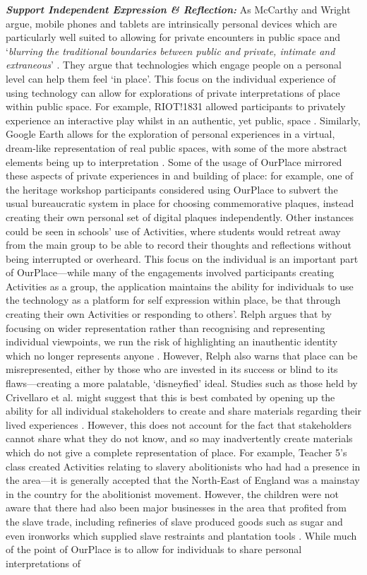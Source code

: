 \textbf{\textit{Support Independent Expression \& Reflection:}} As McCarthy and Wright argue, mobile phones and tablets are intrinsically personal devices which are particularly well suited to allowing for private encounters in public space and `\textit{blurring the traditional boundaries between public and private, intimate and extraneous}' \citep{McCarthy2005}. They argue that technologies which engage people on a personal level can help them feel `in place'. This focus on the individual experience of using technology can allow for explorations of private interpretations of place within public space. For example, RIOT!1831 allowed participants to privately experience an interactive play whilst in an authentic, yet public, space \citep{Blythe2006}. Similarly, Google Earth allows for the exploration of personal experiences in a virtual, dream-like representation of real public spaces, with some of the more abstract elements being up to interpretation \citep{Gerstmann2016}. Some of the usage of OurPlace mirrored these aspects of private experiences in and building of place: for example, one of the heritage workshop participants considered using OurPlace to subvert the usual bureaucratic system in place for choosing commemorative plaques, instead creating their own personal set of digital plaques independently. Other instances could be seen in schools' use of Activities, where students would retreat away from the main group to be able to record their thoughts and reflections without being interrupted or overheard. This focus on the individual is an important part of OurPlace---while many of the engagements involved participants creating Activities as a group, the application maintains the ability for individuals to use the technology as a platform for self expression within place, be that through creating their own Activities or responding to others'. Relph argues that by focusing on wider representation rather than recognising and representing individual viewpoints, we run the risk of highlighting an inauthentic identity which no longer represents anyone \citep{Relph1976}. However, Relph also warns that place can be misrepresented, either by those who are invested in its success or blind to its flaws---creating a more palatable, `disneyfied' ideal. Studies such as those held by Crivellaro et al. might suggest that this is best combated by opening up the ability for all individual stakeholders to create and share materials regarding their lived experiences \citep{Crivellaro2016}. However, this does not account for the fact that stakeholders cannot share what they do not know, and so may inadvertently create materials which do not give a complete representation of place. For example, Teacher 5's class created Activities relating to slavery abolitionists who had had a presence in the area---it is generally accepted that the North-East of England was a mainstay in the country for the abolitionist movement. However, the children were not aware that there had also been major businesses in the area that profited from the slave trade, including refineries of slave produced goods such as sugar and even ironworks which supplied slave restraints and plantation tools \citep{LitPhil2007}. While much of the point of OurPlace is to allow for individuals to share personal interpretations of 
